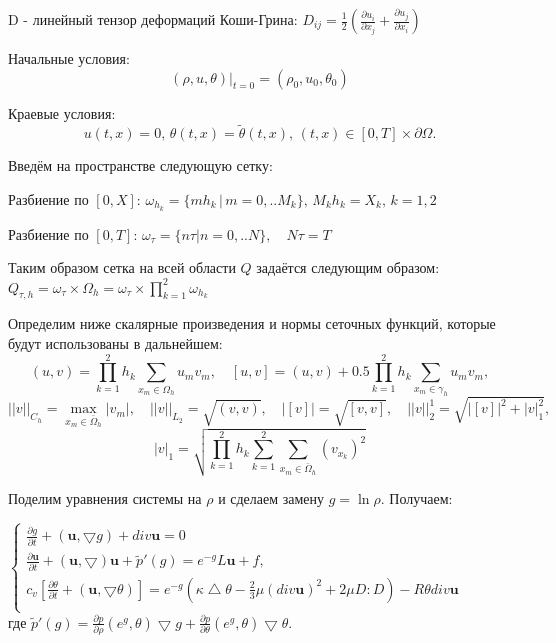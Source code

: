 \documentclass[a4paper]{article}
\theoremstyle{definition}
\numberwithin{equation}{section}
\begin{document}
D - линейный тензор деформаций Коши-Грина: $D_{ij}=\frac{1}{2}\left( \frac{\partial u_i}{\partial x_j} + \frac{\partial u_j}{\partial x_i}\right)$

Начальные условия: $$(\rho, u, \theta)|_{t=0}=(\rho_0, u_0, \theta_0)$$

Краевые условия: $$u(t,x)=0, \, \theta(t,x)=\tilde{\theta}(t,x), \, (t,x)\in[0,T]\times\partial\Omega.$$

Введём на пространстве следующую сетку:

Разбиение по $[0, X] $: $\omega_{h_k} = \{ mh_k \, | \, m=0,..M_k \}, \, M_kh_k=X_k, \, k=1,2$

Разбиение по $[0, T] $: $\omega_{\tau} = \{n\tau | n=0,..N\}, \quad N\tau=T $

Таким образом сетка на всей области $Q$ задаётся следующим образом: $Q_{\tau,h} = \omega_{\tau} \times \Omega_h = \omega_{\tau}\times\prod\limits_{k = 1}^2 \omega_{h_k}$

Определим ниже скалярные произведения и нормы сеточных функций, которые будут использованы в дальнейшем:
$$(u,v) = \prod\limits_{k=1}^{2}h_k\sum\limits_{x_m\in\Omega_h}u_mv_m, \quad [u,v] = (u,v) + 0.5\prod\limits_{k=1}^{2}h_k\sum\limits_{x_m\in\gamma_h}u_mv_m,$$
$$||v||_{C_h} = \max_{x_m\in\bar{\Omega}_h}|v_m|, \quad ||v||_{L_2}=\sqrt{(v,v)}, \quad |[v]|=\sqrt{[v,v]}, \quad ||v||_2^1 = \sqrt{|[v]|^2 + |v|_1^2}, $$
$$|v|_1 = \sqrt{\prod\limits_{k=1}^2h_k \sum\limits_{k=1}^2\sum\limits_{x_m\in\bar{\Omega}_h}(v_{x_k})^2} $$

Поделим уравнения системы на $\rho$ и сделаем замену $g=\ln\rho$. Получаем:

$\begin{cases}
\frac{\partial g}{\partial t} + (\textbf{u}, \bigtriangledown g) + div\textbf{u}=0\\
\frac{\partial\textbf{u}}{\partial t} + (\textbf{u}, \bigtriangledown)\textbf{u} + \tilde{p}'(g) = e^{-g}L\textbf{u} + f,\\
c_v\left[ \frac{\partial \theta}{\partial t} + (\textbf{u},\bigtriangledown \theta)\right] = e^{-g}\left( \kappa\bigtriangleup \theta - \frac{2}{3}\mu (div \textbf{u})^2 + 2\mu D:D\right) - R\theta div\textbf{u} \\
\end{cases}$\\

где $\tilde{p}'(g) = \frac{\partial p}{\partial \rho}(e^g,\theta)\bigtriangledown g + \frac{\partial p}{\partial \theta}(e^g,\theta)\bigtriangledown \theta$.
\end{document}
